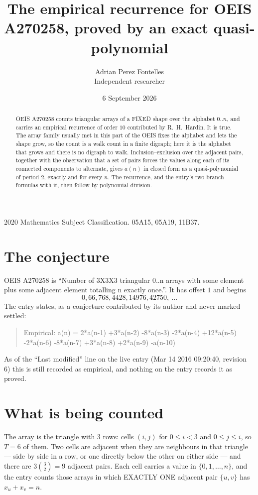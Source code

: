 \documentclass[11pt,a4paper]{article}
\title{The empirical recurrence for OEIS A270258, proved by an exact quasi-polynomial}
\author{Adrian Perez Fontelles\\ \small Independent researcher}
\date{6 September 2026}
\theoremstyle{plain}
\theoremstyle{definition}
\begin{document}
\maketitle

\begin{abstract}
OEIS A270258 counts triangular arrays of a FIXED shape over the alphabet $0..n$, and carries an
empirical recurrence of order $10$ contributed by R.~H.~Hardin. It is true. The array
family usually met in this part of the OEIS fixes the alphabet and lets the shape grow, so the
count is a walk count in a finite digraph; here it is the alphabet that grows and there is no
digraph to walk. Inclusion--exclusion over the adjacent pairs, together with the observation
that a set of pairs forces the values along each of its connected components to alternate,
gives $a(n)$ in closed form as a quasi-polynomial of period $2$, exactly and for every $n$.
The recurrence, and the entry's two branch formulas with it, then follow by polynomial
division.
\end{abstract}

\noindent\small 2020 Mathematics Subject Classification. 05A15, 05A19, 11B37.\normalsize

\section{The conjecture}

OEIS A270258 is ``Number of 3X3X3 triangular 0..n arrays with some element plus some adjacent element totalling n exactly once.''. It has offset $1$ and begins
\[
0, 66, 768, 4428, 14976, 42750,\ \dots
\]
The entry states, as a conjecture contributed by its author and never marked settled:
\begin{quote}
Empirical: a(n) = 2*a(n-1) +3*a(n-2) -8*a(n-3) -2*a(n-4) +12*a(n-5) -2*a(n-6) -8*a(n-7) +3*a(n-8) +2*a(n-9) -a(n-10)
\end{quote}
As of the ``Last modified'' line on the live entry (Mar 14 2016 09:20:40, revision 6) this is still
recorded as empirical, and nothing on the entry records it as proved.

\section{What is being counted}

The array is the triangle with $3$ rows: cells $(i,j)$ for $0\le i<3$ and $0\le j\le i$,
so $T=6$ of them. Two cells are adjacent when they are neighbours in that triangle --- side
by side in a row, or one directly below the other on either side --- and there are
$3\binom{3}{2}=9$ adjacent pairs. Each cell carries a value in
$\{0,1,\dots,n\}$, and the entry counts those arrays in which EXACTLY ONE adjacent pair
$\{u,v\}$ has $x_u+x_v=n$.
\end{document}
